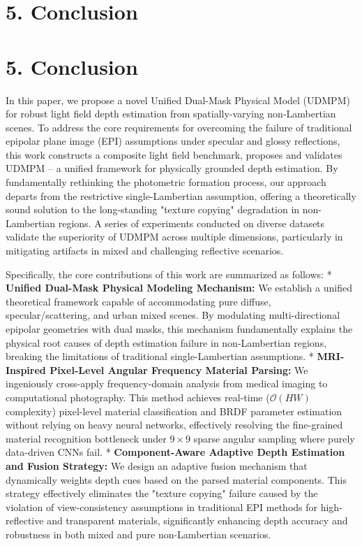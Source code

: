 \section{5. Conclusion}

\section{5. Conclusion}

In this paper, we propose a novel Unified Dual-Mask Physical Model (UDMPM) for robust light field depth estimation from spatially-varying non-Lambertian scenes. To address the core requirements for overcoming the failure of traditional epipolar plane image (EPI) assumptions under specular and glossy reflections, this work constructs a composite light field benchmark, proposes and validates UDMPM – a unified framework for physically grounded depth estimation. By fundamentally rethinking the photometric formation process, our approach departs from the restrictive single-Lambertian assumption, offering a theoretically sound solution to the long-standing "texture copying" degradation in non-Lambertian regions. A series of experiments conducted on diverse datasets validate the superiority of UDMPM across multiple dimensions, particularly in mitigating artifacts in mixed and challenging reflective scenarios. 

Specifically, the core contributions of this work are summarized as follows:
*   \textbf{Unified Dual-Mask Physical Modeling Mechanism:} We establish a unified theoretical framework capable of accommodating pure diffuse, specular/scattering, and urban mixed scenes. By modulating multi-directional epipolar geometries with dual masks, this mechanism fundamentally explains the physical root causes of depth estimation failure in non-Lambertian regions, breaking the limitations of traditional single-Lambertian assumptions.
*   \textbf{MRI-Inspired Pixel-Level Angular Frequency Material Parsing:} We ingeniously cross-apply frequency-domain analysis from medical imaging to computational photography. This method achieves real-time ($\mathcal{O}(HW)$ complexity) pixel-level material classification and BRDF parameter estimation without relying on heavy neural networks, effectively resolving the fine-grained material recognition bottleneck under $9 \times 9$ sparse angular sampling where purely data-driven CNNs fail.
*   \textbf{Component-Aware Adaptive Depth Estimation and Fusion Strategy:} We design an adaptive fusion mechanism that dynamically weights depth cues based on the parsed material components. This strategy effectively eliminates the "texture copying" failure caused by the violation of view-consistency assumptions in traditional EPI methods for high-reflective and transparent materials, significantly enhancing depth accuracy and robustness in both mixed and pure non-Lambertian scenarios.

